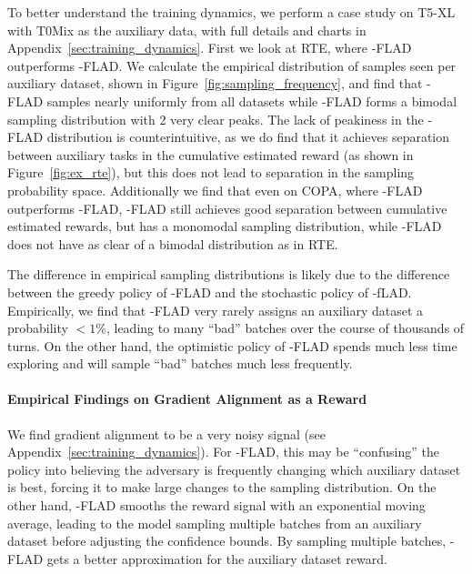 To better understand the training dynamics, we perform a case study on T5-XL with T0Mix as the auxiliary data, with full details and charts in Appendix~\ref{sec:training_dynamics}.
First we look at RTE, where \ucb{}-FLAD outperforms \ex{}-FLAD. We calculate the empirical distribution of samples seen per auxiliary dataset, shown in Figure~\ref{fig:sampling_frequency}, and find that \ex{}-FLAD samples nearly uniformly from all datasets while \ucb{}-FLAD forms a bimodal sampling distribution with 2 very clear peaks.
The lack of peakiness in the \ex{}-FLAD distribution is counterintuitive, as we do find that it achieves separation between auxiliary tasks in the cumulative estimated reward (as shown in Figure~\ref{fig:ex_rte}), but this does not lead to separation in the sampling probability space. 
Additionally we find that even on COPA, where \ex{}-FLAD outperforms \ucb{}-FLAD, \ex{}-FLAD still achieves good separation between cumulative estimated rewards, but has a monomodal sampling distribution, while \ucb{}-FLAD does not have as clear of a bimodal distribution as in RTE.

The difference in empirical sampling distributions is likely due to the difference between the greedy policy of \ucb{}-FLAD and the stochastic policy of \ex{}-fLAD. Empirically, we find that \ex{}-FLAD very rarely assigns an auxiliary dataset a probability $<1$\%, leading to many ``bad'' batches over the course of thousands of turns. On the other hand, the optimistic policy of \ucb{}-FLAD spends much less time exploring and will sample ``bad'' batches much less frequently.


\paragraph{Empirical Findings on Gradient Alignment as a Reward}
We find gradient alignment to be a very noisy signal (see Appendix~\ref{sec:training_dynamics}). For \ex{}-FLAD, this may be ``confusing'' the policy into believing the adversary is frequently changing which auxiliary dataset is best, forcing it to make large changes to the sampling distribution. On the other hand, \ucb{}-FLAD smooths the reward signal with an exponential moving average, leading to the model sampling multiple batches from an auxiliary dataset before adjusting the confidence bounds. By sampling multiple batches, \ucb{}-FLAD gets a better approximation for the auxiliary dataset reward.

